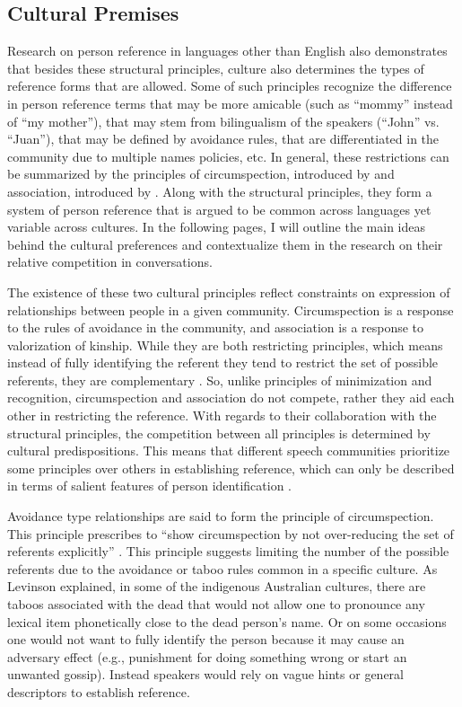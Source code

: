 \documentclass[12pt]{turabian-researchpaper}
\begin{document}
\subsection{Cultural Premises}
Research on person reference in languages other than English also demonstrates that besides these structural principles, culture also determines the types of reference forms that are allowed. Some of such principles recognize the difference in person reference terms that may be more amicable (such as ``mommy'' instead of ``my mother''), that may stem from bilingualism of the speakers (``John'' vs. ``Juan''), that may be defined by avoidance rules, that are differentiated in the community due to multiple names policies, etc. In general, these restrictions can be summarized by the principles of circumspection, introduced by \textcite{levinson2007} and association, introduced by \textcite{brown2007}. Along with the structural principles, they form a system of person reference that is argued to be common across languages yet variable across cultures. In the following pages, I will outline the main ideas behind the cultural preferences and contextualize them in the research on their relative competition in conversations.  

The existence of these two cultural principles reflect constraints on expression of relationships between people in a given community. Circumspection is a response to the rules of avoidance in the community, and association is a response to valorization of kinship. While they are both restricting principles, which means instead of fully identifying the referent they tend to restrict the set of possible referents, they are complementary \parencite{blythe2009}. So, unlike principles of minimization and recognition, circumspection and association do not compete, rather they aid each other in restricting the reference. With regards to their collaboration with the structural principles, the competition between all principles is determined by cultural predispositions. This means that different speech communities prioritize some principles over others in establishing reference, which can only be described in terms of salient features of person identification \parencite{enfield2013a}. 

Avoidance type relationships are said to form the principle of circumspection. This principle prescribes to ``show circumspection by not over-reducing the set of referents explicitly'' \parencite[p. 31]{levinson2007}. This principle suggests limiting the number of the possible referents due to the avoidance or taboo rules common in a specific culture. As Levinson explained, in some of the indigenous Australian cultures, there are taboos associated with the dead that would not allow one to pronounce any lexical item phonetically close to the dead person's name. Or on some occasions one would not want to fully identify the person because it may cause an adversary effect (e.g., punishment for doing something wrong or start an unwanted gossip). Instead speakers would rely on vague hints or general descriptors to establish reference. 
\end{document}
